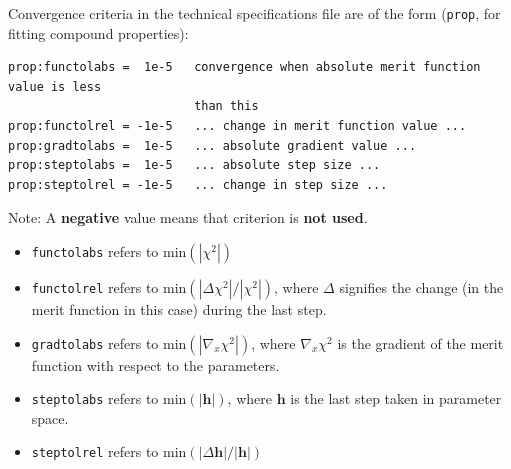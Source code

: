 \documentclass[a4paper,12pt,pdftex,onecolumn]{article}
\begin{document}
Convergence criteria in the technical specifications file are of the form
(\verb+prop+, for fitting compound properties):

\begin{Verbatim}[fontsize=\relsize{-1},frame=single]
prop:functolabs =  1e-5   convergence when absolute merit function value is less
                          than this
prop:functolrel = -1e-5   ... change in merit function value ...
prop:gradtolabs =  1e-5   ... absolute gradient value ...
prop:steptolabs =  1e-5   ... absolute step size ...
prop:steptolrel = -1e-5   ... change in step size ...
\end{Verbatim}

Note: A \textbf{negative} value means that criterion is \textbf{not used}.

\begin{itemize}
\item
\verb+functolabs+ refers to $\mathrm{min}(|\chi^2|)$

\item
\verb+functolrel+ refers to $\mathrm{min}(|\Delta \chi^2|/|\chi^2|)$, where
$\Delta$ signifies the change (in the merit function in this case) during the
last step.

\item
\verb+gradtolabs+ refers to $\mathrm{min}(|\nabla_x \chi^2|)$, where $\nabla_x \chi^2$
is the gradient of the merit function with respect to the parameters.

\item
\verb+steptolabs+ refers to $\mathrm{min}(|\mathbf{h}|)$, where $\mathbf{h}$ is
the last step taken in parameter space.

\item
\verb+steptolrel+ refers to $\mathrm{min}(|\Delta \mathbf{h}|/|\mathbf{h}|)$
\end{itemize}


















\end{document}
